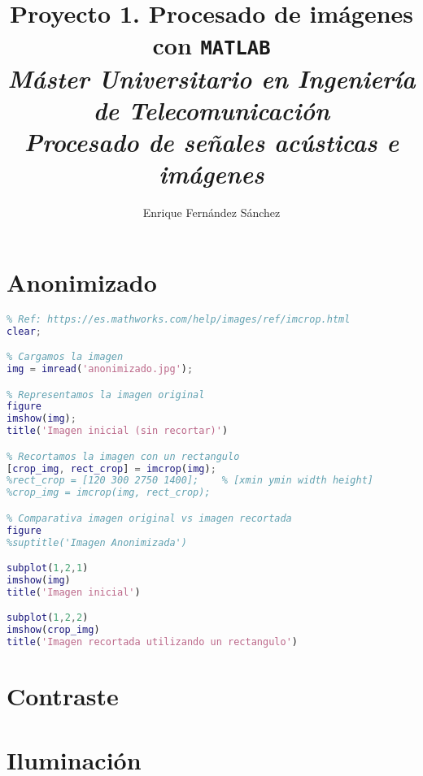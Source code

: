 \documentclass[12pt]{article}
\begin{document}
	
	\title{Proyecto 1. Procesado de imágenes con \texttt{MATLAB} \\ \textit{\textbf{\large Máster Universitario en Ingeniería de Telecomunicación}} \\ \textit{\large Procesado de señales acústicas e imágenes}}
	\author{Enrique Fernández Sánchez}
	
	\maketitle
	
	\tableofcontents
	
	\lstlistoflistings
	
	\pagebreak
	
	\section{Anonimizado}
	
	\begin{lstlisting}[language=Matlab, caption={Implementación en MATLAB para anonimizado}]
% 1 - Anonimizado Enrique 2021/2022
% Ref: https://es.mathworks.com/help/images/ref/imcrop.html
clear;

% Cargamos la imagen
img = imread('anonimizado.jpg');

% Representamos la imagen original
figure
imshow(img);
title('Imagen inicial (sin recortar)')

% Recortamos la imagen con un rectangulo
[crop_img, rect_crop] = imcrop(img);
%rect_crop = [120 300 2750 1400];    % [xmin ymin width height]
%crop_img = imcrop(img, rect_crop);

% Comparativa imagen original vs imagen recortada
figure
%suptitle('Imagen Anonimizada')

subplot(1,2,1)
imshow(img)
title('Imagen inicial')

subplot(1,2,2)
imshow(crop_img)
title('Imagen recortada utilizando un rectangulo')
	\end{lstlisting}
	
	\section{Contraste}
	
	\section{Iluminación}
	
\end{document}
